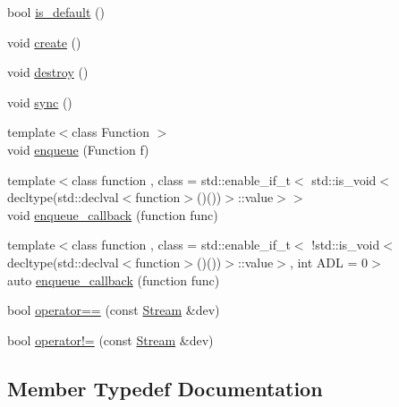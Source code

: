 \begin{DoxyCompactItemize}
\item 
bool \hyperlink{classbc_1_1streams_1_1Stream_3_01device__tag_01_4_a36a2ac18cb901c755e5885d0a96a9c42}{is\+\_\+default} ()
\item 
void \hyperlink{classbc_1_1streams_1_1Stream_3_01device__tag_01_4_af8e8fb55779a89aec8ba132e25dc7a1d}{create} ()
\item 
void \hyperlink{classbc_1_1streams_1_1Stream_3_01device__tag_01_4_ac82cc272085638ed69a9de6c7146b15f}{destroy} ()
\item 
void \hyperlink{classbc_1_1streams_1_1Stream_3_01device__tag_01_4_afc2e619f75d90c96a253db36b235caaf}{sync} ()
\item 
{\footnotesize template$<$class Function $>$ }\\void \hyperlink{classbc_1_1streams_1_1Stream_3_01device__tag_01_4_ae893fe2fa7e6141cf7865979896220b6}{enqueue} (Function f)
\item 
{\footnotesize template$<$class function , class  = std\+::enable\+\_\+if\+\_\+t$<$				std\+::is\+\_\+void$<$						decltype(std\+::declval$<$function$>$()())$>$\+::value$>$$>$ }\\void \hyperlink{classbc_1_1streams_1_1Stream_3_01device__tag_01_4_a192d44e2c6eda47b3bda66567ae23cd7}{enqueue\+\_\+callback} (function func)
\item 
{\footnotesize template$<$class function , class  = std\+::enable\+\_\+if\+\_\+t$<$				!std\+::is\+\_\+void$<$						decltype(std\+::declval$<$function$>$()())$>$\+::value$>$, int A\+DL = 0$>$ }\\auto \hyperlink{classbc_1_1streams_1_1Stream_3_01device__tag_01_4_a094bcf56ef60a630cef64dbadb7e9040}{enqueue\+\_\+callback} (function func)
\item 
bool \hyperlink{classbc_1_1streams_1_1Stream_3_01device__tag_01_4_aee2c55379b2a053466078c004d382f83}{operator==} (const \hyperlink{classbc_1_1streams_1_1Stream}{Stream} \&dev)
\item 
bool \hyperlink{classbc_1_1streams_1_1Stream_3_01device__tag_01_4_aa031f65322c674ee9106a9471f8508fe}{operator!=} (const \hyperlink{classbc_1_1streams_1_1Stream}{Stream} \&dev)
\end{DoxyCompactItemize}


\subsection{Member Typedef Documentation}
\mbox{\label{classbc_1_1streams_1_1Stream_3_01device__tag_01_4_ad6e752fa317da0549e72b1d5118887ee}} 
